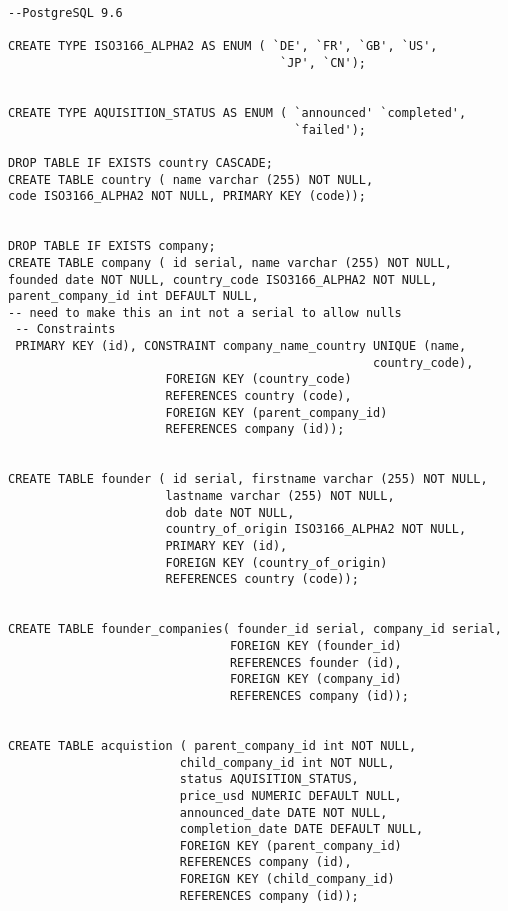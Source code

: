 \documentclass[12pt]{article}
\begin{document}
\begin{verbatim}
--PostgreSQL 9.6

CREATE TYPE ISO3166_ALPHA2 AS ENUM ( `DE', `FR', `GB', `US',
                                      `JP', `CN');


CREATE TYPE AQUISITION_STATUS AS ENUM ( `announced' `completed',
                                        `failed');

DROP TABLE IF EXISTS country CASCADE;
CREATE TABLE country ( name varchar (255) NOT NULL,
code ISO3166_ALPHA2 NOT NULL, PRIMARY KEY (code));


DROP TABLE IF EXISTS company;
CREATE TABLE company ( id serial, name varchar (255) NOT NULL,
founded date NOT NULL, country_code ISO3166_ALPHA2 NOT NULL,
parent_company_id int DEFAULT NULL,
-- need to make this an int not a serial to allow nulls
 -- Constraints
 PRIMARY KEY (id), CONSTRAINT company_name_country UNIQUE (name,
                                                   country_code),
                      FOREIGN KEY (country_code)
                      REFERENCES country (code),
                      FOREIGN KEY (parent_company_id)
                      REFERENCES company (id));


CREATE TABLE founder ( id serial, firstname varchar (255) NOT NULL,
                      lastname varchar (255) NOT NULL,
                      dob date NOT NULL,
                      country_of_origin ISO3166_ALPHA2 NOT NULL,
                      PRIMARY KEY (id),
                      FOREIGN KEY (country_of_origin)
                      REFERENCES country (code));


CREATE TABLE founder_companies( founder_id serial, company_id serial,
                               FOREIGN KEY (founder_id)
                               REFERENCES founder (id),
                               FOREIGN KEY (company_id)
                               REFERENCES company (id));


CREATE TABLE acquistion ( parent_company_id int NOT NULL,
                        child_company_id int NOT NULL,
                        status AQUISITION_STATUS,
                        price_usd NUMERIC DEFAULT NULL,
                        announced_date DATE NOT NULL,
                        completion_date DATE DEFAULT NULL,
                        FOREIGN KEY (parent_company_id)
                        REFERENCES company (id),
                        FOREIGN KEY (child_company_id)
                        REFERENCES company (id));

\end{verbatim}
\end{document}
